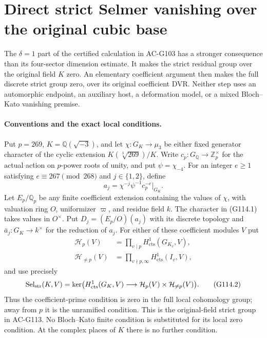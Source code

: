 \section{Direct strict Selmer vanishing over the original cubic base}
\label{sec:cubic-original-strict-vanishing}

The $\delta=1$ part of the certified calculation in AC-G103 has a
stronger consequence than its four-sector dimension estimate.
It makes the strict residual group over the original field $K$ zero.
An elementary coefficient argument then makes the full discrete
strict group zero, over its original coefficient DVR.  Neither step
uses an automorphic endpoint, an auxiliary host, a deformation model,
or a mixed Bloch--Kato vanishing premise.

\paragraph{Conventions and the exact local conditions.}
Put $p=269$, $K=\mathbb Q(\sqrt{-3})$, and let
$\chi:G_K\to\mu_3$ be either fixed generator character of the
cyclic extension $K(\sqrt[3]{269})/K$.
Write $c_p:G_{\mathbb Q}\to\mathbb Z_p^\times$ for the actual
action on $p$-power roots of unity, and put $\psi=\chi_{-4}$.
For an integer $e\ge1$ satisfying $e\equiv267\pmod{268}$ and
$j\in\{1,2\}$, define
\[
 a_j=\chi^{-j}\psi^{-1}c_p^{-e}|_{G_K}.
 \tag{G114.1}
\]
Let $E_p/\mathbb Q_p$ be any finite coefficient extension containing
the values of $\chi$, with valuation ring $O$, uniformizer $\varpi$,
and residue field $k$.  The character in (G114.1) takes values in
$O^\times$.  Put $D_j=(E_p/O)(a_j)$ with its discrete topology and
$\bar a_j:G_K\to k^\times$ for the reduction of $a_j$.
For either of these coefficient modules $V$ put
\[
 \begin{split}
 \mathcal H_p(V)&=\prod_{v\mid p}H^1_{\mathrm{cts}}(G_{K_v},V),\\
 \mathcal H_{\ne p}(V)&=\prod_{v\nmid p,\infty}
                                 H^1_{\mathrm{cts}}(I_v,V),
 \end{split}
\]
and use precisely
\[
 \operatorname{Sel}_{\rm str}(K,V)=\ker\bigl(
 H^1_{\mathrm{cts}}(G_K,V)\longrightarrow
                    \mathcal H_p(V)\times\mathcal H_{\ne p}(V)\bigr).
 \tag{G114.2}
\]
Thus the coefficient-prime condition is zero in the full local
cohomology group; away from $p$ it is the unramified condition.
This is the original-field strict group in AC-G113.
No Bloch--Kato finite condition is substituted for its local zero
condition.  At the complex places of $K$ there is no further condition.

